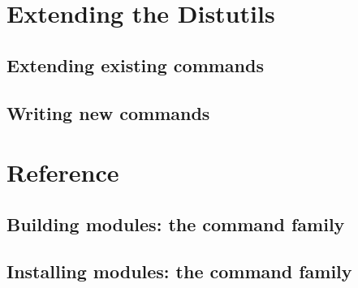 \documentclass{howto}
\begin{document}
\section{Extending the Distutils}
\label{extending}


\subsection{Extending existing commands}
\label{extend-existing}


\subsection{Writing new commands}
\label{new-commands}



\section{Reference}
\label{ref}


\subsection{Building modules: the \protect{} command family}
\label{build-cmds}

\subsubsection{\protect{}}
\label{build-cmd}

\subsubsection{\protect{}}
\label{build-py-cmd}

\subsubsection{\protect{}}
\label{build-ext-cmd}

\subsubsection{\protect{}}
\label{build-clib-cmd}


\subsection{Installing modules: the \protect{} command family}
\label{install-cmd}
\end{document}
